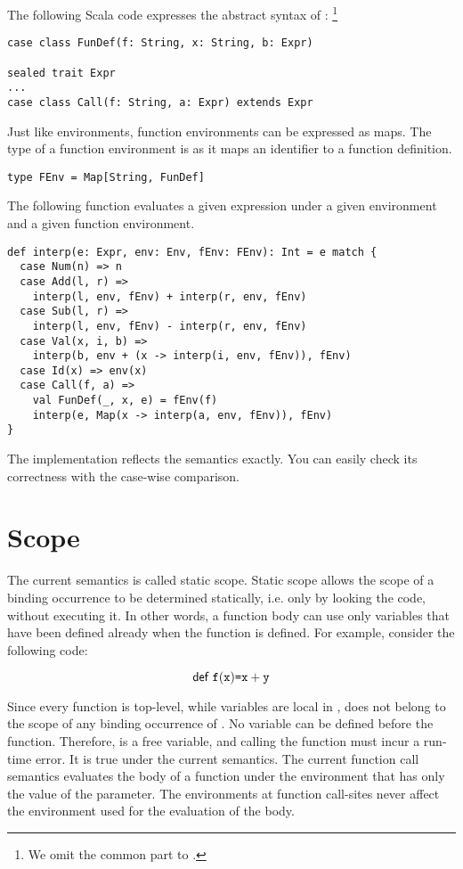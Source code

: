 The following Scala code expresses the abstract syntax of \Lang:
\footnote{We omit the common part to \plang.}

\begin{verbatim}
case class FunDef(f: String, x: String, b: Expr)

sealed trait Expr
...
case class Call(f: String, a: Expr) extends Expr
\end{verbatim}

Just like environments, function environments can be expressed as maps.
The type of a function environment is  as it maps an
identifier to a function definition.

\begin{verbatim}
type FEnv = Map[String, FunDef]
\end{verbatim}

The following function evaluates a given expression under a given environment
and a given function environment.

\begin{verbatim}
def interp(e: Expr, env: Env, fEnv: FEnv): Int = e match {
  case Num(n) => n
  case Add(l, r) =>
    interp(l, env, fEnv) + interp(r, env, fEnv)
  case Sub(l, r) =>
    interp(l, env, fEnv) - interp(r, env, fEnv)
  case Val(x, i, b) =>
    interp(b, env + (x -> interp(i, env, fEnv)), fEnv)
  case Id(x) => env(x)
  case Call(f, a) =>
    val FunDef(_, x, e) = fEnv(f)
    interp(e, Map(x -> interp(a, env, fEnv)), fEnv)
}
\end{verbatim}

The implementation reflects the semantics exactly. You can easily check its
correctness with the case-wise comparison.

\section{Scope}

The current semantics is called static scope. Static scope allows the scope of a
binding occurrence to be determined statically, i.e. only by looking the code,
without executing it. In other words, a function body can use only variables
that have been defined already when the function is defined.
For example, consider the following code:

\[
  \textsf{def}\ \texttt{f}(\texttt{x})\texttt{=}\texttt{x}+\texttt{y}
\]

Since every function is top-level, while variables are local in \Lang, 
does not belong to the scope of any binding occurrence of . No variable
can be defined before the function. Therefore,
 is a free variable, and calling the function  must incur a
run-time error. It is true under the current semantics. The current function
call semantics evaluates the body of a function under the environment that has
only the value of the parameter. The environments at function call-sites never
affect the environment used for the evaluation of the body.

